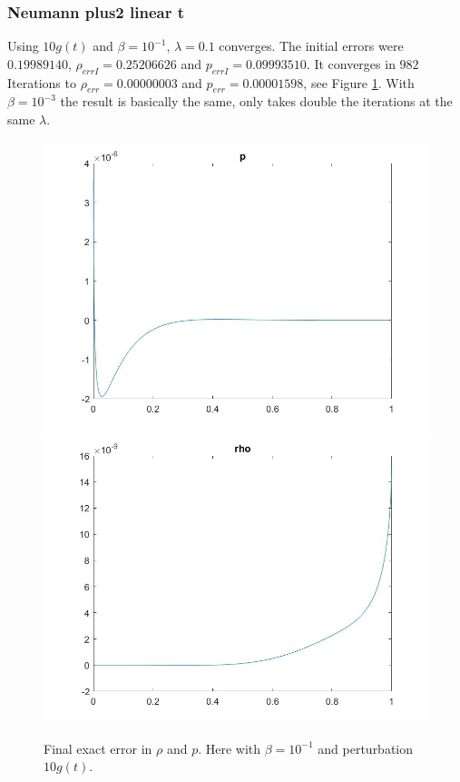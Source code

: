 \documentclass[11pt, a4paper]{article}
\theoremstyle{definition}
\begin{document}
\subsubsection*{Neumann plus2 linear t}

Using $10g(t)$ and $\beta=10^{-1}$, $\lambda =0.1$ converges. The initial errors were $0.19989140$, $\rho_{errI} = 0.25206626$ and $p_{errI}= 0.09993510$. It converges in $982$ Iterations to $\rho_{err} = 0.00000003$ and $p_{err} = 0.00001598$, see Figure \ref{Figlint6}. With $\beta=10^{-3}$ the result is basically the same, only takes double the iterations at the same $\lambda$. 



\begin{figure}[h]
	\includegraphics[scale=0.3]{MultNp21.jpg}
	\includegraphics[scale=0.3]{MultNp22.jpg}
	\caption{Final exact error in $\rho$ and $p$. Here with $\beta =10^{-1}$ and perturbation $10g(t)$.}
	\label{Figlint6}
\end{figure}
\end{document}
